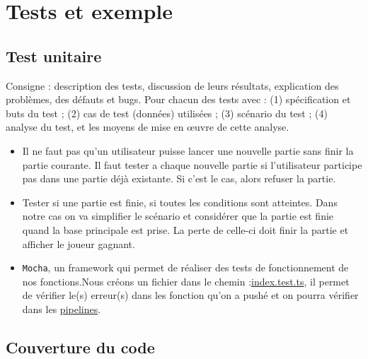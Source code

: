 \section{Tests et exemple}
\subsection{Test unitaire}

Consigne : description des tests, discussion de leurs résultats, explication des problèmes, des défauts et bugs. Pour chacun des tests avec : (1) spécification et buts du test ;
(2) cas de test (données) utilisées ; (3) scénario du test ; (4) analyse du test, et les moyens de mise en œuvre de cette analyse.

\begin{itemize}
    \item Il ne faut pas qu'un utilisateur puisse lancer une nouvelle partie sans finir la partie courante. Il faut tester a chaque nouvelle partie si l'utilisateur participe pas dans une partie déjà existante. Si c'est le cas, alors refuser la partie.
    \item Tester si une partie est finie, si toutes les conditions sont atteintes. Dans notre cas on va simplifier le scénario et considérer que la partie est finie quand la base principale est prise. La perte de celle-ci doit finir la partie et afficher le joueur gagnant.
    \item \lstinline{Mocha}, un framework qui permet de réaliser des tests de fonctionnement de nos fonctions.Nous créons un fichier dans le chemin :\href{https://gitlab.emi.u-bordeaux.fr/vsamson/desert-fox/-/blob/main/src/backend/src/test/index.test.ts}{index.test.ts}, il permet de vérifier le(s) erreur(s) dans les fonction qu'on a pushé et on pourra vérifier dans les \href{https://gitlab.emi.u-bordeaux.fr/vsamson/desert-fox/-/pipelines}{pipelines}.
    
    
\end{itemize}

\subsection{Couverture du code}

